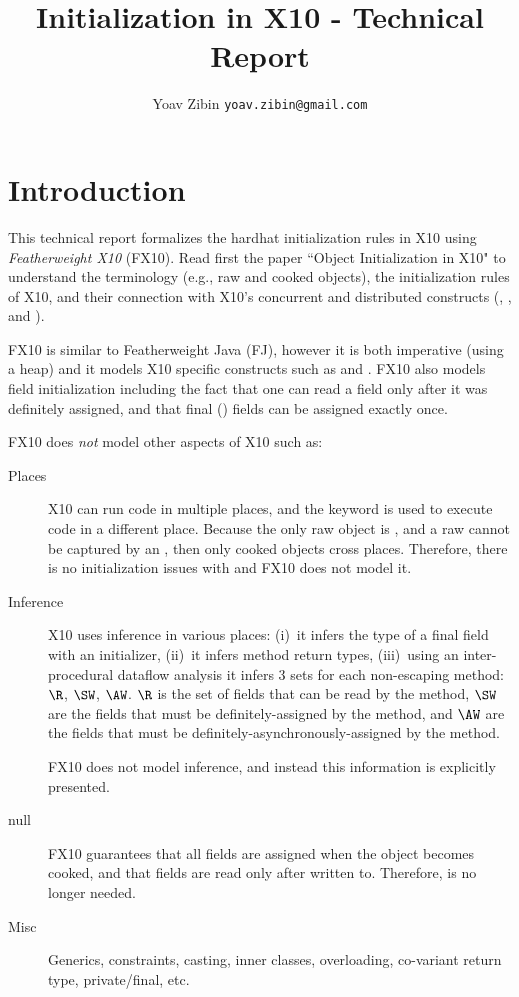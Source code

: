\documentclass[9pt,a4paper]{article}
\title{Initialization in X10 - Technical Report}
\author{Yoav Zibin \texttt{yoav.zibin@gmail.com}}
\date{}
\begin{document}
\maketitle


\lstset{language=java,basicstyle=\ttfamily\small}

\section{Introduction}
This technical report formalizes the hardhat initialization rules in X10
    using \emph{Featherweight X10} (FX10).
Read first the paper ``Object Initialization in X10" to understand
    the terminology (e.g., raw and cooked objects),
    the initialization rules of X10,
    and their connection with X10's concurrent and distributed constructs (\finish, \async, and ).

FX10 is similar to Featherweight Java (FJ), however it is both imperative (using a heap) and it
    models X10 specific constructs such as \finish and \async.
FX10 also models field initialization including the fact that one can read a field only after it was definitely assigned,
    and that final () fields can be assigned exactly once.

FX10 does \emph{not} model other aspects of X10 such as:
\begin{description}
  \item[Places] X10 can run code in multiple places, and the  keyword is used to execute code in a different place.
    Because the only raw object is \this,
        and a raw \this cannot be captured by an ,
        then only cooked objects cross places.
    Therefore, there is no initialization issues with  and FX10 does not model it.
  \item[Inference]
    X10 uses inference in various places:
        (i)~it infers the type of a final field with an initializer,
        (ii)~it infers method return types,
        (iii)~using an inter-procedural dataflow analysis it infers
            3 sets for each non-escaping method: $\R$, $\SW$, $\AW$.
            $\R$ is the set of fields that can be read by the method,
                $\SW$ are the fields that must be definitely-assigned by the method,
                and $\AW$ are the fields that must be definitely-asynchronously-assigned by the method.

    FX10 does not model inference, and instead this information is explicitly presented.
  \item[null]
    FX10 guarantees that all fields are assigned when the object becomes cooked,
        and that fields are read only after written to.
    Therefore, \hnull is no longer needed.

  \item[Misc]
    Generics, constraints, casting, inner classes, overloading, co-variant return type, private/final, etc.
\end{description}
\end{document}
